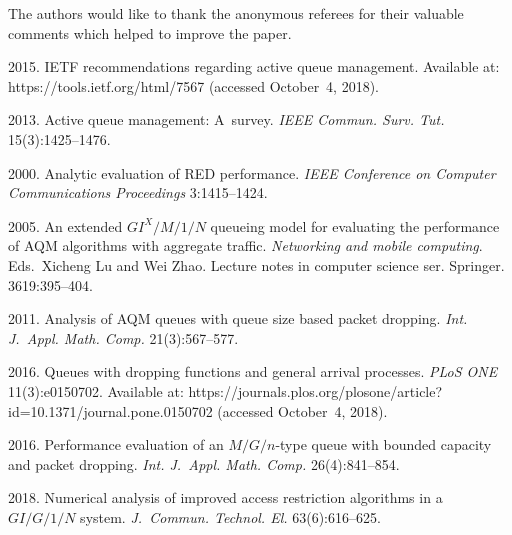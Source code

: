 \begin{multicols}{2}
The authors would like to thank the anonymous referees for their valuable comments 
which helped to improve the paper.
  
 \renewcommand{\bibname}{\protect\rmfamily References}


\vspace*{-6pt}

{\small\frenchspacing
{\baselineskip=10.65pt
\begin{thebibliography}{99}
 2015.
IETF recommendations regarding active queue management.
Available at: {\sf https://tools.ietf.org/html/7567} (accessed October~4, 2018).



 2013. 
Active queue management: A~survey. \textit{IEEE Commun. Surv.
Tut.} 15(3):1425--1476.

2000. Analytic evaluation of RED performance. 
\textit{IEEE Conference on Computer Communications Proceedings}
3:1415--1424.

 2005.
An extended $GI^X/M/1/N$ queueing
model for evaluating the performance of AQM algorithms
with aggregate traffic.
\textit{Networking and mobile computing}.
Eds.\ Xicheng Lu and Wei Zhao.
{Lecture notes in computer science ser.} Springer. 3619:395--404.

2011. Analysis of AQM queues with queue size based packet
dropping. \textit{Int. J.~Appl. Math. Comp.} 21(3):567--577.

 2016. 
Queues with dropping functions and general arrival
processes. \textit{PLoS ONE} 11(3):e0150702. Available at: 
{\sf https://\linebreak journals.plos.org/plosone/article?id=10.1371/journal.\linebreak pone.0150702} 
(accessed October~4, 2018).

 2016. Performance evaluation of 
an $M/G/n$-type queue
with bounded capacity and packet dropping. \textit{Int. J.~Appl.
Math. Comp.} 26(4):841--854.




 2018. 
Numerical analysis of improved access restriction algorithms in a~$GI/G/1/N$
system. \textit{J.~Commun. Technol. El.} 63(6):616--625. 



\end{thebibliography}}}
\end{multicols}
